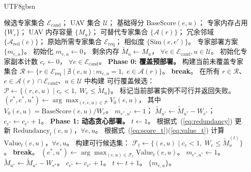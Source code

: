 \documentclass[conference]{IEEEtran}
\begin{document}
\begin{CJK*}{UTF8}{gbsn}
\begin{algorithm}[t]
  \caption{动态贪心专家部署算法}
  \label{alg:greedy_placement}
  \begin{algorithmic}[1]
    \REQUIRE 候选专家集合 $\mathcal{E}_{\mathrm{cand}}$；
             UAV 集合 $\mathcal{U}$；
             基础得分 $\mathrm{BaseScore}(e,u)$；
             专家内存占用 $\{W_e\}$；
             UAV 内存容量 $\{M_u\}$；
             可替代专家集合 $\{\mathcal{A}(r)\}$；
             冗余邻域 $\{\mathcal{A}_{\mathrm{red}}(e)\}$；
             原始所需专家集合 $\mathcal{E}_{\mathrm{req}}$；
             相似度 $\{\mathrm{Sim}(e,e')\}$。
    \ENSURE 专家部署方案 $\{m_{e,u}\}$。
    \STATE 初始化 $m_{e,u} \leftarrow 0$，
           剩余内存 $\tilde{M}_u \leftarrow M_u$，
           $\forall e\in\mathcal{E}_{\mathrm{cand}}, u\in\mathcal{U}$。
    \STATE 初始化专家副本计数 $c_e\leftarrow 0$，
           $\forall e\in\mathcal{E}_{\mathrm{cand}}$。
    \STATE \textbf{Phase 0: 覆盖预部署。}
      \STATE 构建当前未覆盖专家集合
             $\mathcal{R}\leftarrow\{r\in\mathcal{E}_{\mathrm{req}}
             \mid \nexists(e,u):m_{e,u}=1,\; e\in\mathcal{A}(r)\}$。
        \STATE \textbf{break}。
      \ENDIF
      \STATE 在所有 $r\in\mathcal{R}$、$e\in\mathcal{A}(r)\cap
             \mathcal{E}_{\mathrm{cand}}$、$u\in\mathcal{U}$ 中构建
             可行覆盖候选：
             $\mathcal{P}\leftarrow\{(r,e,u)\mid c_e<1,\;
             W_e\le\tilde{M}_u\}$。
        \STATE 标记当前部署实例不可行并返回失败。
      \ENDIF
      \STATE $(r^*,e^*,u^*)\leftarrow
             \arg\max_{(r,e,u)\in\mathcal{P}} V_0(e,u)$，
             其中 $V_0(e,u)=\mathrm{BaseScore}(e,u)/W_e$。
      \STATE $m_{e^*,u^*}\leftarrow 1$；
             $\tilde{M}_{u^*}\leftarrow\tilde{M}_{u^*}-W_{e^*}$；
             $c_{e^*}\leftarrow c_{e^*}+1$。
    \ENDWHILE
    \STATE \textbf{Phase 1: 动态贪心部署。}
    \STATE $t \leftarrow 1$。
    \LOOP
      \STATE 根据式~(\ref{eq:redundancy}) 更新
             $\mathrm{Redundancy}_t(e,u)$，$\forall e,u$。
      \STATE 根据式~(\ref{eq:score_t})(\ref{eq:value_t}) 计算
             $\mathrm{Value}_t(e,u)$，$\forall e,u$。
      \STATE 构建可行候选集：
             $\mathcal{F}_t \leftarrow \{(e,u) \mid c_e<1,\;
               W_e \le \tilde{M}_u^{(t)}\}$。
        \STATE \textbf{break}。
      \ENDIF
      \STATE $(e^*,u^*) \leftarrow \arg\max_{(e,u)\in\mathcal{F}_t}
             \mathrm{Value}_t(e,u)$。
      \STATE $m_{e^*,u^*} \leftarrow 1$。
      \STATE $\tilde{M}_{u^*} \leftarrow \tilde{M}_{u^*} - W_{e^*}$。
      \STATE $c_{e^*}\leftarrow c_{e^*}+1$。
      \STATE $t \leftarrow t + 1$。
    \ENDLOOP
    \RETURN $\{m_{e,u}\}$。
  \end{algorithmic}
\end{algorithm}


\end{CJK*}
\end{document}
